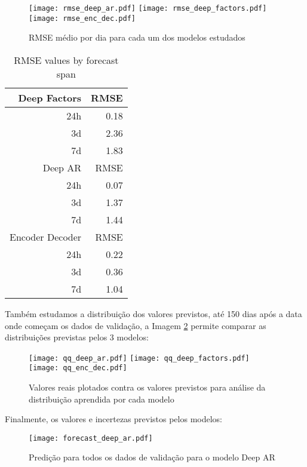 \begin{figure}[H]
\label{fig:rmseday}
\centering
\texttt{[image: rmse\_deep\_ar.pdf]} \hfill
\texttt{[image: rmse\_deep\_factors.pdf]} \hfill
\texttt{[image: rmse\_enc\_dec.pdf]} 
\caption{RMSE médio por dia para cada um dos modelos estudados} 
\end{figure}


\begin{center}
\begin{table}[htbp]
\caption{\label{tab:rmse}
RMSE values by forecast span}
\centering
\begin{tabular}{rr}
\hline
Deep Factors & RMSE\\
\hline
24h & 0.18\\
3d & 2.36\\
7d & 1.83\\
\hline
Deep AR & RMSE\\
\hline
24h & 0.07\\
3d & 1.37\\
7d & 1.44\\
\hline
Encoder Decoder & RMSE\\
\hline
24h & 0.22\\
3d & 0.36\\
7d & 1.04\\
\end{tabular}
\end{table}
\end{center}


Também estudamos a distribuição dos valores previstos, até 150 dias após a data onde começam os dados de validação, a Imagem \ref{fig:distr} permite comparar as distribuições previstas pelos 3 modelos:

\begin{figure}[H]
\label{fig:distr}
\centering
\texttt{[image: qq\_deep\_ar.pdf]} \hfill
\texttt{[image: qq\_deep\_factors.pdf]} \hfill
\texttt{[image: qq\_enc\_dec.pdf]} 
\caption{Valores reais plotados contra os valores previstos para análise da distribuição aprendida por cada modelo} 
\end{figure}


Finalmente, os valores e incertezas previstos pelos modelos:


\begin{figure}[H]
  \label{fig:fordeepar}
  \centering
\texttt{[image: forecast\_deep\_ar.pdf]} 
\caption{Predição para todos os dados de validação para o modelo Deep AR}
\end{figure}

